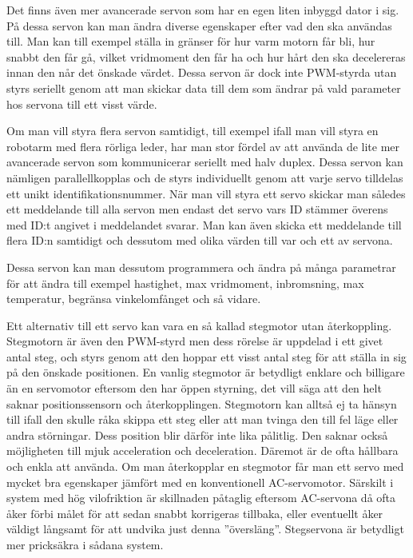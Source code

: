 \documentclass[a4paper,12pt]{article}
\begin{document}
Det finns även mer avancerade servon som har en egen liten inbyggd dator i sig. På dessa servon kan man ändra diverse egenskaper efter vad den ska användas till. Man kan till exempel ställa in gränser för hur varm motorn får bli, hur snabbt den får gå, vilket vridmoment den får ha och hur hårt den ska decelereras innan den når det önskade värdet. Dessa servon är dock inte PWM-styrda utan styrs seriellt genom att man skickar data till dem som ändrar på vald parameter hos servona till ett visst värde. 
 
Om man vill styra flera servon samtidigt, till exempel ifall man vill styra en robotarm med flera rörliga leder, har man stor fördel av att använda de lite mer avancerade servon som kommunicerar seriellt med halv duplex. Dessa servon kan nämligen parallellkopplas och de styrs individuellt genom att varje servo tilldelas ett unikt identifikationsnummer. När man vill styra ett servo skickar man således ett meddelande till alla servon men endast det servo vars ID stämmer överens med ID:t angivet i meddelandet svarar. Man kan även skicka ett meddelande till flera ID:n samtidigt och dessutom med olika värden till var och ett av servona. 
 
Dessa servon kan man dessutom programmera och ändra på många parametrar för att ändra till exempel hastighet, max vridmoment, inbromsning, max temperatur, begränsa vinkelomfånget och så vidare. \cite{dyn-manual}

Ett alternativ till ett servo kan vara en så kallad stegmotor utan återkoppling. Stegmotorn är även den PWM-styrd men dess rörelse är uppdelad i ett givet antal steg, och styrs genom att den hoppar ett visst antal steg för att ställa in sig på den önskade positionen. En vanlig stegmotor är betydligt enklare och billigare än en servomotor eftersom den har öppen styrning, det vill säga att den helt saknar positionssensorn och återkopplingen. Stegmotorn kan alltså ej ta hänsyn till ifall den skulle råka skippa ett steg eller att man tvinga den till fel läge eller andra störningar. Dess position blir därför inte lika pålitlig. Den saknar också möjligheten till mjuk acceleration och deceleration. Däremot är de ofta hållbara och enkla att använda. Om man återkopplar en stegmotor får man ett servo med mycket bra egenskaper jämfört med en konventionell AC-servomotor.  Särskilt i system med hög vilofriktion är skillnaden påtaglig eftersom AC-servona då ofta åker förbi målet för att sedan snabbt korrigeras tillbaka, eller eventuellt åker väldigt långsamt för att undvika just denna ”översläng”. Stegservona är betydligt mer pricksäkra i sådana system. \cite{sigbi}
\end{document}
